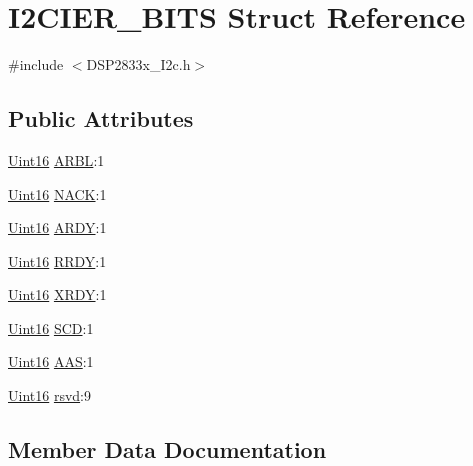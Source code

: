 \hypertarget{struct_i2_c_i_e_r___b_i_t_s}{}\section{I2\+C\+I\+E\+R\+\_\+\+B\+I\+T\+S Struct Reference}
\label{struct_i2_c_i_e_r___b_i_t_s}


{\ttfamily \#include $<$D\+S\+P2833x\+\_\+\+I2c.\+h$>$}

\subsection*{Public Attributes}
\begin{DoxyCompactItemize}
\item 
\hyperlink{_d_s_p2833x___device_8h_a59a9f6be4562c327cbfb4f7e8e18f08b}{Uint16} \hyperlink{struct_i2_c_i_e_r___b_i_t_s_ad2662239e960372a770c6ab64daa832f}{A\+R\+B\+L}\+:1
\item 
\hyperlink{_d_s_p2833x___device_8h_a59a9f6be4562c327cbfb4f7e8e18f08b}{Uint16} \hyperlink{struct_i2_c_i_e_r___b_i_t_s_afbace54d084b73b4852794c2a47dff89}{N\+A\+C\+K}\+:1
\item 
\hyperlink{_d_s_p2833x___device_8h_a59a9f6be4562c327cbfb4f7e8e18f08b}{Uint16} \hyperlink{struct_i2_c_i_e_r___b_i_t_s_a53884050226bcd70c2c2898afad903ba}{A\+R\+D\+Y}\+:1
\item 
\hyperlink{_d_s_p2833x___device_8h_a59a9f6be4562c327cbfb4f7e8e18f08b}{Uint16} \hyperlink{struct_i2_c_i_e_r___b_i_t_s_a362c4a72ba104ac1251e2a66c7a6e18e}{R\+R\+D\+Y}\+:1
\item 
\hyperlink{_d_s_p2833x___device_8h_a59a9f6be4562c327cbfb4f7e8e18f08b}{Uint16} \hyperlink{struct_i2_c_i_e_r___b_i_t_s_a21ae35a5bdb1cc156fc9ad9377e89082}{X\+R\+D\+Y}\+:1
\item 
\hyperlink{_d_s_p2833x___device_8h_a59a9f6be4562c327cbfb4f7e8e18f08b}{Uint16} \hyperlink{struct_i2_c_i_e_r___b_i_t_s_aaccd32a49a4fc8b5ffc7d871b623240d}{S\+C\+D}\+:1
\item 
\hyperlink{_d_s_p2833x___device_8h_a59a9f6be4562c327cbfb4f7e8e18f08b}{Uint16} \hyperlink{struct_i2_c_i_e_r___b_i_t_s_a17af651ee272f9c89edf51418fdb387f}{A\+A\+S}\+:1
\item 
\hyperlink{_d_s_p2833x___device_8h_a59a9f6be4562c327cbfb4f7e8e18f08b}{Uint16} \hyperlink{struct_i2_c_i_e_r___b_i_t_s_a232176eed3b43139da52140a3107345a}{rsvd}\+:9
\end{DoxyCompactItemize}


\subsection{Member Data Documentation}
\hypertarget{struct_i2_c_i_e_r___b_i_t_s_a17af651ee272f9c89edf51418fdb387f}{}
